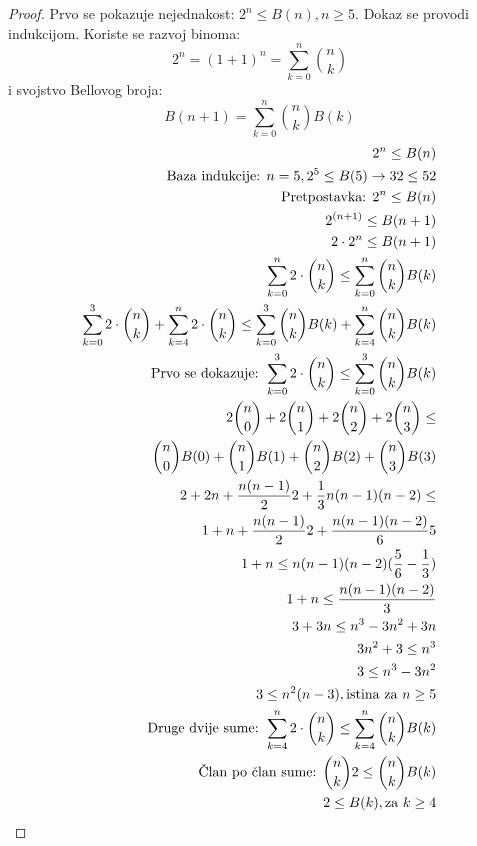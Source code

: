 \documentclass[times, utf8, diplomski, numeric]{fer}
\begin{document}
\begin{proof}
Prvo se pokazuje nejednakost: $2^n\le B(n), n \ge 5$.
Dokaz se provodi indukcijom. Koriste se razvoj binoma: 
\[ 2^n=(1+1)^n = \sum_{k=0}^{n}\binom{n}{k} \] 
i svojstvo Bellovog broja: 
\[ B(n+1)=\sum_{k=0}^{n}\binom{n}{k}B(k) \]
	\begin{align}
		2^n \le B(n) \\
		\textup{Baza indukcije: } n = 5, 2^5 \le B(5) \rightarrow 32 \le 52 \\
		\textup{Pretpostavka: } 2^n \le B(n) \\
		2^{(n+1)} \le B(n+1) \\
		2\cdot 2^n \le B(n+1) \\
		\sum_{k=0}^{n} 2\cdot \binom{n}{k} \le \sum_{k=0}^{n}\binom{n}{k}B(k)\\
		\sum_{k=0}^{3} 2\cdot \binom{n}{k} + \sum_{k=4}^{n} 2\cdot \binom{n}{k} \le \sum_{k=0}^{3}\binom{n}{k}B(k) + \sum_{k=4}^{n}\binom{n}{k}B(k) \\
		\textup{Prvo se dokazuje: } \sum_{k=0}^{3} 2\cdot \binom{n}{k} \le \sum_{k=0}^{3}\binom{n}{k}B(k) \\
		2\binom{n}{0} + 2\binom{n}{1} + 2\binom{n}{2} + 2\binom{n}{3} \le \\ \binom{n}{0}B(0) + \binom{n}{1}B(1) + \binom{n}{2}B(2) + \binom{n}{3}B(3) \\
		2+2n+\frac{n(n-1)}{2}2+\frac{1}{3}n(n-1)(n-2) \le \\1 + n + \frac{n(n-1)}{2}2+\frac{n(n-1)(n-2)}{6}5 \\
		1+n \le n(n-1)(n-2)(\frac{5}{6}-\frac{1}{3}) \\
		1+n \le \frac{n(n-1)(n-2)}{3} \\
		3+3n\le n^3 - 3n^2 +3n \\
		3n^2+3 \le n^3 \\
		3 \le n^3 - 3n^2 \\
		3 \le n^2 (n - 3), \textup{istina za } n\ge 5 \\
		\textup{Druge dvije sume: } \sum_{k=4}^{n} 2\cdot \binom{n}{k} \le \sum_{k=4}^{n}\binom{n}{k}B(k) \\
		\textup{Član po član sume: }\binom{n}{k} 2 \le \binom{n}{k} B(k) \\
		2 \le B(k), \textup{za } k \ge 4
	\end{align}
\end{proof}
\end{document}
